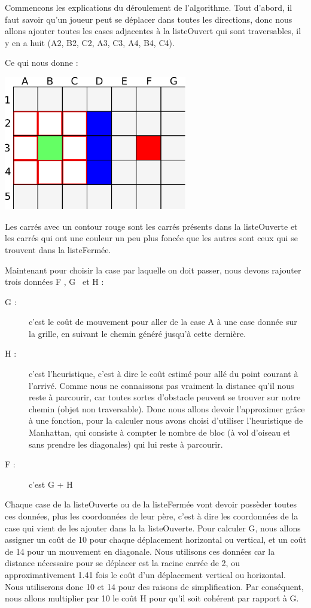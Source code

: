 		
			Commencons les explications du déroulement de l'algorithme.
			Tout d'abord, il faut savoir qu'un joueur peut se déplacer dans toutes les
			directions, donc nous allons ajouter toutes les cases adjacentes à la
			listeOuvert qui sont traversables, il y en a huit (A2, B2, C2, A3, C3, A4, B4, C4).
			
			
			Ce qui nous donne :
		
			\begin{center}
				\includegraphics[width=8cm]{./Analyse/Img/Grille2.eps}
			\end{center}
		
			Les carrés avec un contour rouge sont les carrés présents dans la
			listeOuverte et les carrés qui ont une couleur un peu plus foncée que les
			autres sont ceux qui se trouvent dans la listeFermée.
		
			Maintenant pour choisir la case par laquelle on doit passer, nous devons rajouter trois données \og F \fg , \og G \fg \, et \og H \fg:
			\begin{description}
				\item[G : ]{c'est le coût de mouvement pour aller de la case A à une case donnée sur la grille, en suivant le chemin généré jusqu'à cette dernière.}
				\item[H :]{c'est l'heuristique, c'est à dire le coût estimé pour allé du point courant à l'arrivé. Comme nous ne connaissons pas vraiment la distance qu'il nous reste à parcourir, car toutes sortes d'obstacle peuvent se trouver sur notre chemin (objet non traversable). Donc nous allons devoir l'approximer grâce à une fonction, pour la calculer nous avons choisi d'utiliser l'heuristique de Manhattan, qui consiste à compter le nombre de bloc (à vol d'oiseau et sans prendre les diagonales) qui lui reste à parcourir.}
				\item[F :]{c'est G + H}
			\end{description} 
		
			Chaque case de la listeOuverte ou de la listeFermée vont devoir possèder toutes ces données, plus les coordonnées de leur père, c'est à dire les coordonnées de la case qui vient de les ajouter dans la la listeOuverte. Pour calculer G, nous allons assigner un coût de 10 pour chaque déplacement horizontal ou vertical, et un coût de 14 pour un mouvement en diagonale. Nous utilisons ces données car la distance nécessaire pour se déplacer est la racine carrée de 2, ou approximativement 1.41 fois le coût d'un déplacement vertical ou horizontal. Nous utiliserons donc 10 et 14 pour des raisons de simplification. Par conséquent, nous allons multiplier par 10 le coût H pour qu'il soit cohérent par rapport à G.
	
